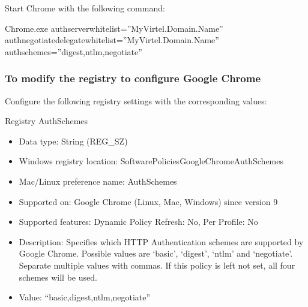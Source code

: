 \documentclass[letterpaper,10pt,english]{sphinxmanual}
\begin{document}
\sphinxAtStartPar
{}

\sphinxAtStartPar
Start Chrome with the following command:

\begin{sphinxVerbatim}[commandchars=\\\{\}]
Chrome.exe  \textendash{}auth\PYGZhy{}server\PYGZhy{}whitelist=”MyVirtel.Domain.Name”
            \textendash{}auth\PYGZhy{}negotiate\PYGZhy{}delegatewhitelist=”MyVirtel.Domain.Name”
            \textendash{}auth\PYGZhy{}schemes=”digest,ntlm,negotiate”
\end{sphinxVerbatim}


\subsubsection{To modify the registry to configure Google Chrome}
\label{\detokenize{Customization:to-modify-the-registry-to-configure-google-chrome}}
\sphinxAtStartPar
Configure the following registry settings with the corresponding values:

\sphinxAtStartPar
Registry AuthSchemes
\begin{itemize}
\item {} 
\sphinxAtStartPar
Data type: String (REG\_SZ)

\item {} 
\sphinxAtStartPar
Windows registry location: SoftwarePoliciesGoogleChromeAuthSchemes

\item {} 
\sphinxAtStartPar
Mac/Linux preference name: AuthSchemes

\item {} 
\sphinxAtStartPar
Supported on: Google Chrome (Linux, Mac, Windows) since version 9

\item {} 
\sphinxAtStartPar
Supported features: Dynamic Policy Refresh: No, Per Profile: No

\item {} 
\sphinxAtStartPar
Description: Specifies which HTTP Authentication schemes are supported by Google Chrome. Possible values are ‘basic’, ‘digest’, ‘ntlm’ and ‘negotiate’. Separate multiple values with commas. If this policy is left not set, all four schemes will be used.

\item {} 
\sphinxAtStartPar
Value: “basic,digest,ntlm,negotiate”

\end{itemize}
\end{document}
